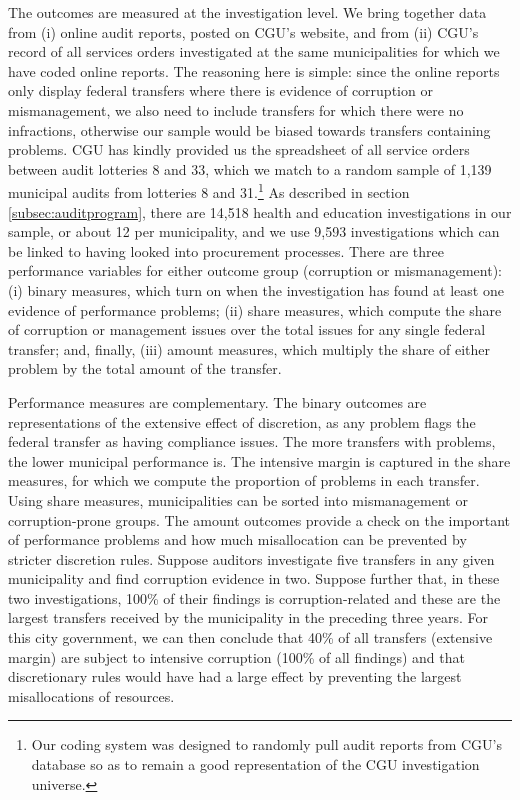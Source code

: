 \documentclass[11pt]{article}
\begin{document}
The outcomes are measured at the investigation level. We bring together data from (i) online audit reports, posted on CGU's website, and from (ii) CGU's record of all services orders investigated at the same municipalities for which we have coded online reports. The reasoning here is simple: since the online reports only display federal transfers where there is evidence of corruption or mismanagement, we also need to include transfers for which there were no infractions, otherwise our sample would be biased towards transfers containing problems. CGU has kindly provided us the spreadsheet of all service orders between audit lotteries 8 and 33, which we match to a random sample of 1,139 municipal audits from lotteries 8 and 31.\footnote{Our coding system was designed to randomly pull audit reports from CGU's database so as to remain a good representation of the CGU investigation universe.} As described in section \ref{subsec:auditprogram}, there are 14,518 health and education investigations in our sample, or about 12 per municipality, and we use 9,593 investigations which can be linked to having looked into procurement processes. There are three performance variables for either outcome group (corruption or mismanagement): (i) binary measures, which turn on when the investigation has found at least one evidence of performance problems; (ii) share measures, which compute the share of corruption or management issues over the total issues for any single federal transfer; and, finally, (iii) amount measures, which multiply the share of either problem by the total amount of the transfer.

Performance measures are complementary. The binary outcomes are representations of the extensive effect of discretion, as any problem flags the federal transfer as having compliance issues. The more transfers with problems, the lower municipal performance is. The intensive margin is captured in the share measures, for which we compute the proportion of problems in each transfer. Using share measures, municipalities can be sorted into mismanagement or corruption-prone groups. The amount outcomes provide a check on the important of performance problems and how much misallocation can be prevented by stricter discretion rules. Suppose auditors investigate five transfers in any given municipality and find corruption evidence in two. Suppose further that, in these two investigations, 100\% of their findings is corruption-related and these are the largest transfers received by the municipality in the preceding three years. For this city government, we can then conclude that 40\% of all transfers (extensive margin) are subject to intensive corruption (100\% of all findings) and that discretionary rules would have had a large effect by preventing the largest misallocations of resources.
\end{document}

